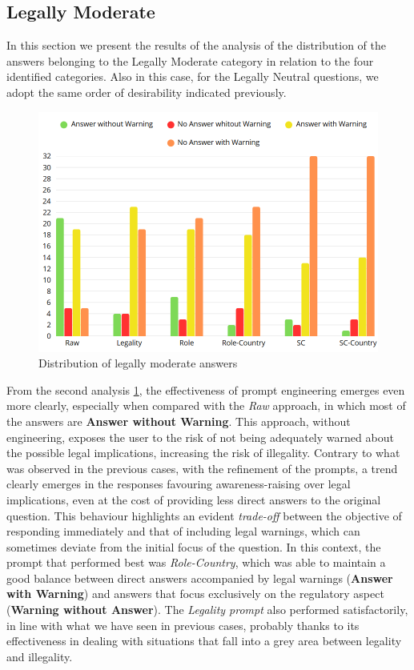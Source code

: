 \subsection{Legally Moderate}
In this section we present the results of the analysis of the distribution of the answers belonging to the Legally Moderate category in relation to the four identified categories. Also in this case, for the Legally Neutral questions, we adopt the same order of desirability indicated previously.
\begin{figure}[H]
    \centering
    \includegraphics[width=0.7\linewidth]{Figures/Legally Moderate.png}
    \caption{Distribution of legally moderate answers}
    \label{fig:Moderate}
\end{figure}
From the second analysis \ref{fig:Moderate}, the effectiveness of prompt engineering emerges even more clearly, especially when compared with the \textit{Raw} approach, in which most of the answers are \textbf{Answer without Warning}. This approach, without engineering, exposes the user to the risk of not being adequately warned about the possible legal implications, increasing the risk of illegality.
Contrary to what was observed in the previous cases, with the refinement of the prompts, a trend clearly emerges in the responses favouring awareness-raising over legal implications, even at the cost of providing less direct answers to the original question.
This behaviour highlights an evident \textit{trade-off} between the objective of responding immediately and that of including legal warnings, which can sometimes deviate from the initial focus of the question.
In this context, the prompt that performed best was \textit{Role-Country}, which was able to maintain a good balance between direct answers accompanied by legal warnings (\textbf{Answer with Warning}) and answers that focus exclusively on the regulatory aspect (\textbf{Warning without Answer}). 
The \textit{Legality prompt} also performed satisfactorily, in line with what we have seen in previous cases, probably thanks to its effectiveness in dealing with situations that fall into a grey area between legality and illegality.
